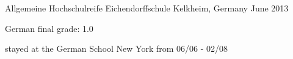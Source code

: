 \begin{cventries}
  \cventry
    {Allgemeine Hochschulreife} %
    {Eichendorffschule} %
    {Kelkheim, Germany} %
    {June 2013} %
    {
      \begin{cvitems} %
        \item {German final grade: 1.0}
        \item {stayed at the German School New York from 06/06 - 02/08}
      \end{cvitems}
    }
\end{cventries}
